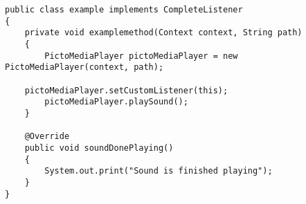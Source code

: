 \begin{lstlisting}[caption={Example of \textit{PictoMediaPlayer}.},label={lst:mediaplayerexample}]
public class example implements CompleteListener
{
    private void examplemethod(Context context, String path)
    {
        PictoMediaPlayer pictoMediaPlayer = new PictoMediaPlayer(context, path);

	pictoMediaPlayer.setCustomListener(this);
        pictoMediaPlayer.playSound();
    }

    @Override
    public void soundDonePlaying()
    {
        System.out.print("Sound is finished playing");
    }
}
\end{lstlisting}





